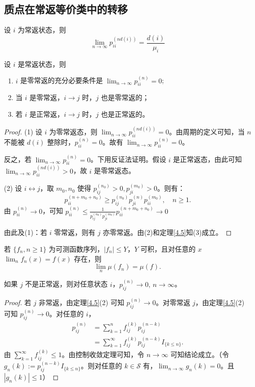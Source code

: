 \documentclass[lang=cn,10pt,thmcnt=section]{elegantbook}
\begin{document}
\subsection{质点在常返等价类中的转移}
\begin{theorem}
	设 $i$ 为常返状态，则
\[
\lim_{n \to \infty} p_{ii}^{(nd(i))} = \frac{d(i)}{\mu_i}
\]
\end{theorem}
\begin{theorem}
	设 $i$ 是常返状态，则
	\begin{enumerate}
		\item $i$ 是零常返的充分必要条件是 $\lim_{n \to \infty} p_{ii}^{(n)} = 0$;
		\item 当 $i$ 是零常返，$i \rightarrow j$ 时，$j$ 也是零常返的；
		\item 若 $i$ 是正常返，$i \rightarrow j$ 时，$j$ 也是正常返的。
	\end{enumerate}
\end{theorem}
\begin{proof}
	(1) 设 $i$ 为零常返态，则 $\lim_{n \to \infty} p_{ii}^{(nd(i))} = 0$。由周期的定义可知，当 $n$ 不能被 $d(i)$ 整除时，$p_{ii}^{(n)} = 0$。故有 $\lim_{n \to \infty} p_{ii}^{(n)} = 0$。

反之，若 $\lim_{n \to \infty} p_{ii}^{(n)} = 0$。下用反证法证明。假设 $i$ 是正常返态，由此可知 $\lim_{n \to \infty} p_{ii}^{(nd(i))} > 0$，故 $i$ 是零常返态。

(2) 设 $i \leftrightarrow j$，取 $m_0, n_0$ 使得 $p_{ij}^{(n_0)} > 0, p_{ji}^{(m_0)} > 0$。则有：
\[
p_{ii}^{(n + m_0 + n_0)} \geq p_{ij}^{(n_0)} p_{ji}^{(n)} p_{ii}^{(m_0)}, \quad n \geq 1.
\]
由 $p_{ii}^{(n)} \to 0$，可知 $p_{ii}^{(n)} \leq \frac{1}{p_{ij}^{(n_0)} p_{ji}^{(m_0)}} p_{ii}^{(n + m_0 + n_0)} \to 0$

由此及(1)：若 $i$ 零常返，则有 $j$ 亦零常返。由(2)和定理\ref{4.5}知(3)成立。

\end{proof}

\begin{theorem}
	若 $\{f_n, n \geq 1\}$ 为可测函数序列，$|f_n| \leq Y$，$Y$ 可积，且对任意的 $x$ $\lim_n f_n(x) = f(x)$ 存在，则
\[
\lim_n \mu(f_n) = \mu(f).
\]
\end{theorem}
\begin{example}
	如果 $j$ 不是正常返，则对任意状态 $i$，$p_{ij}^{(n)} \to 0, \, n \to \infty$。

\end{example}
\begin{proof}
	若 $j$ 非常返，由定理\ref{4.5}(2) 可知 $p_{ij}^{(n)} \to 0$。对零常返 $j$，由定理\ref{4.5}(2) 可知 $p_{ij}^{(n)} \to 0$。对任意的 $i$，
\begin{align*}
p_{ij}^{(n)} &= \sum_{k=1}^{n} f_{ij}^{(k)} p_{ij}^{(n-k)} \\
&= \sum_{k=1}^{\infty} f_{ij}^{(k)} p_{ij}^{(n-k)} I_{\{k \leq n\}}.
\end{align*}
由 $\sum_{k=1}^{\infty} f_{ij}^{(k)} \leq 1$。由控制收敛定理可知，令 $n \to \infty$ 可知结论成立。（令 $g_n(k) := p_{ij}^{(n-k)} I_{\{k \leq n\}}$。则对任意的 $k \in \mathcal{S}$ 有，$\lim_{n \to \infty} g_n(k) = 0$。且 $|g_n(k)| \leq 1$）
\end{proof}
\end{document}
